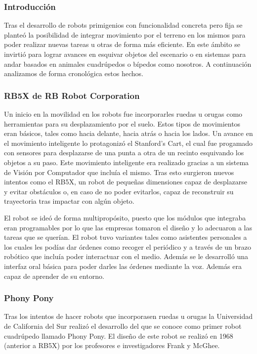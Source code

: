 \subsubsection{Introducción}

Tras el desarrollo de robots primigenios con funcionalidad concreta pero fija se planteó la posibilidad de integrar movimiento por el terreno en los mismos para poder realizar nuevas tareas u otras de forma más eficiente. En este ámbito se invirtió para lograr avances en esquivar objetos del escenario o en sistemas para andar basados en animales cuadrúpedos o bípedos como nosotros. A continuación analizamos de forma cronológica estos hechos.

\subsubsection{RB5X de RB Robot Corporation}
Un inicio en la movilidad en los robots fue incorporarles ruedas u orugas como herramientas para su desplazamiento por el suelo. Estos tipos de movimientos eran básicos, tales como hacia delante, hacia atrás o hacia los lados. Un avance en el movimiento inteligente lo protagonizó el Stanford's Cart, el cual fue progamado con sensores para desplazarse de una punta a otra de un recinto esquivando los objetos a su paso. Este movimiento inteligente era realizado gracias a un sistema de Visión por Computador que incluía el mismo. Tras esto surgieron nuevos intentos como el RB5X, un robot de pequeñas dimensiones capaz de desplazarse y evitar obstáculos o, en caso de no poder evitarlos, capaz de reconstruir su trayectoria tras impactar con algún objeto.

El robot se ideó de forma multipropósito, puesto que los módulos que integraba eran programables por lo que las empresas tomaron el diseño y lo adecuaron a las tareas que se querían. El robot tuvo variantes tales como asistentes personales a los cuales les podías dar órdenes como recoger el periódico y a través de un brazo robótico que incluía poder interactuar con el medio. Además se le desarrolló una interfaz oral básica para poder darles las órdenes mediante la voz. Además era capaz de aprender de su entorno.

\subsubsection{Phony Pony}

Tras los intentos de hacer robots que incorporasen ruedas u orugas la Universidad de California del Sur realizó el desarrollo del que se conoce como primer robot cuadrúpedo llamado Phony Pony. El diseño de este robot se realizó en 1968 (anterior a RB5X) por los profesores e investigadores Frank y McGhee.

